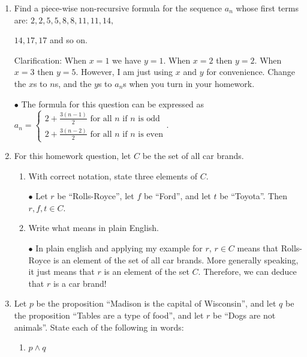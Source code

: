 \documentclass{article}
\begin{document}
\begin{enumerate}

  \item
        Find a piece-wise non-recursive formula for the sequence $a_n$ whose first terms are: $2,2,5,5,8,8,11,11,14,$

        $14,17,17$ and so on.

        Clarification: When $x=1$ we have $y=1$. When $x=2$ then $y=2$. When $x=3$ then $y=5$. However, I am just using $x$ and $y$ for convenience. Change the $x$s to $n$s, and the $y$s to $a_n$s when you turn in your homework.

        $\bullet$ The formula for this question can be expressed as
        $a_n = \begin{cases}
            2 + \frac{3(n-1)}{2} \text{ for all } n \text{ if } n \text{ is odd} \\
            2 + \frac{3(n-2)}{2} \text{ for all } n \text{ if } n \text{ is even}
          \end{cases}$.

  \item
        For this homework question, let $C$ be the set of all car brands.
        \begin{enumerate}
          \item With correct notation, state three elements of $C$.

                $\bullet$ Let $r$ be ``Rolls-Royce'', let $f$ be ``Ford'', and let $t$ be ``Toyota''. Then $r, f, t \in C$.

          \item Write what  means in plain English.

                $\bullet$ In plain english and applying my example for $r$, $r \in C$ means that Rolls-Royce is an element of the set of all car brands. More generally speaking, it just means that $r$ is an element of the set $C$. Therefore, we can deduce that $r$ is a car brand!

        \end{enumerate}

  \item
        Let $p$ be the proposition ``Madison is the capital of Wisconsin'', and let $q$ be the proposition ``Tables are a type of food'', and let $r$ be ``Dogs are not animals''. State each of the following in words:
        \begin{enumerate}
          \item $p \wedge q$


\end{enumerate}
\end{enumerate}
\end{document}

